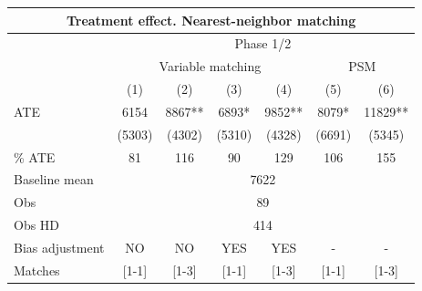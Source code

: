 \begin{tabular}{lcccc|cc}
\toprule
\multicolumn{7}{c}{Treatment effect. Nearest-neighbor matching} \\
\midrule
\midrule
      & \multicolumn{6}{c}{Phase 1/2} \\
\midrule
\midrule
      & \multicolumn{4}{c|}{Variable matching} & \multicolumn{2}{c}{PSM} \\
\midrule
\midrule
      & (1)   & (2)   & (3)   & (4)   & (5)   & (6) \\
\midrule
ATE   & 6154  & 8867** & 6893* & 9852** & 8079* & 11829** \\
      & (5303) & (4302) & (5310) & (4328) & (6691) & (5345) \\
\% ATE & 81    & 116   & 90    & 129   & 106   & 155 \\
Baseline mean & \multicolumn{6}{c}{7622} \\
Obs   & \multicolumn{6}{c}{89} \\
Obs HD & \multicolumn{6}{c}{414} \\
Bias adjustment & NO    & NO    & YES   & YES   & -     & - \\
Matches & [1-1] & [1-3] & [1-1] & [1-3] & [1-1] & [1-3] \\
\bottomrule
\bottomrule
\end{tabular}%
